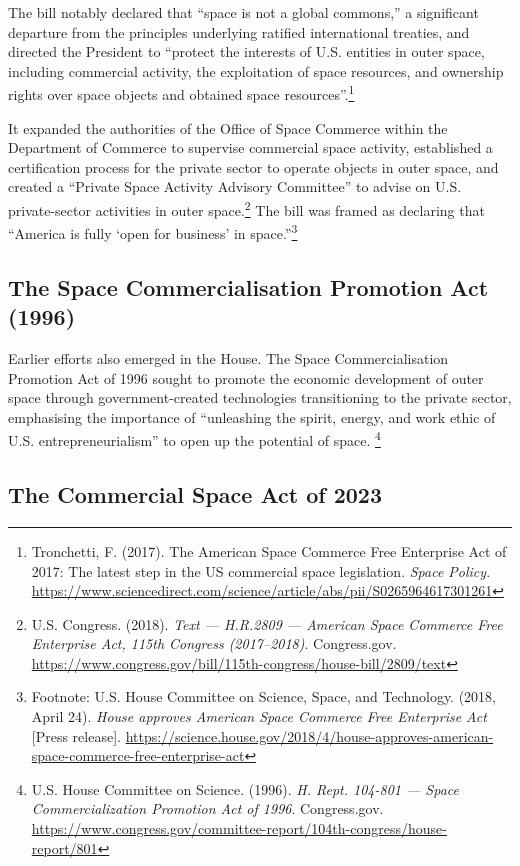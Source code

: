 The bill notably declared that “space is not a global commons,” a significant departure from the principles underlying ratified international treaties, and directed the President to “protect the interests of U.S. entities in outer space, including commercial activity, the exploitation of space resources, and ownership rights over space objects and obtained space resources”.\footnote{Tronchetti, F. (2017). The American Space Commerce Free Enterprise Act of 2017: The latest step in the US commercial space legislation. \emph{Space Policy}. \url{https://www.sciencedirect.com/science/article/abs/pii/S0265964617301261}}

It expanded the authorities of the Office of Space Commerce within the Department of Commerce to supervise commercial space activity, established a certification process for the private sector to operate objects in outer space, and created a “Private Space Activity Advisory Committee” to advise on U.S. private-sector activities in outer space.\footnote{U.S. Congress. (2018). \emph{Text — H.R.2809 — American Space Commerce Free Enterprise Act, 115th Congress (2017–2018)}. Congress.gov. \url{https://www.congress.gov/bill/115th-congress/house-bill/2809/text}} The bill was framed as declaring that “America is fully ‘open for business’ in space.”\footnote{Footnote: U.S. House Committee on Science, Space, and Technology. (2018, April 24). \emph{House approves American Space Commerce Free Enterprise Act} [Press release]. \url{https://science.house.gov/2018/4/house-approves-american-space-commerce-free-enterprise-act}}

\subsection{The Space Commercialisation Promotion Act (1996)}

Earlier efforts also emerged in the House. The Space Commercialisation Promotion Act of 1996 sought to promote the economic development of outer space through government-created technologies transitioning to the private sector, emphasising the importance of “unleashing the spirit, energy, and work ethic of U.S. entrepreneurialism” to open up the potential of space. \footnote{U.S. House Committee on Science. (1996). \emph{H. Rept. 104-801 — Space Commercialization Promotion Act of 1996}. Congress.gov. \url{https://www.congress.gov/committee-report/104th-congress/house-report/801}}

\subsection{The Commercial Space Act of 2023}

